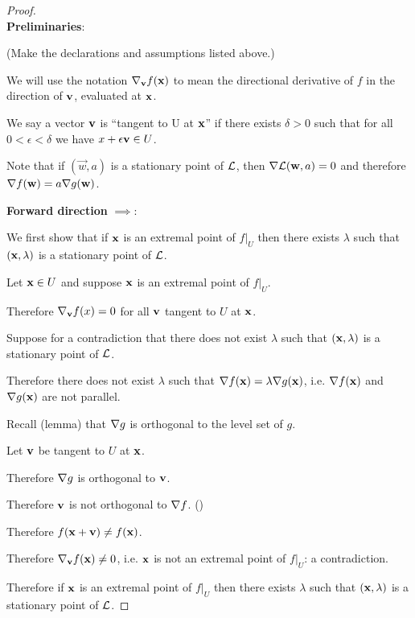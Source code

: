 \begin{lemma}
  \todo{}
\end{lemma}


\begin{proof}~\\
  {\bf Preliminaries}:

  (Make the declarations and assumptions listed above.)

  We will use the notation $\nabla_{\mathbf{v}} f(\mathbf x)$ to mean the directional derivative of $f$ in the
  direction of $\mathbf v$, evaluated at $\mathbf x$.

  We say a vector $\mathbf v$ is ``tangent to U at $\mathbf x$'' if there exists $\delta > 0$ such that for all
  $0 < \epsilon < \delta$ we have $x + \epsilon \mathbf v \in U$. 

  Note that if $(\vec{w}, a)$ is a stationary point of $\mathcal{L}$, then $\nabla \mathcal{L}(\mathbf{w}, a) = 0$ and therefore
  $\nabla f(\mathbf{w}) = a \nabla g(\mathbf{w})$.

  {\bf Forward direction} $\implies$:

  We first show that if $\mathbf x$ is an extremal point of $f|_U$ then there exists $\lambda$ such
  that $(\mathbf x, \lambda)$ is a stationary point of $\mathcal{L}$.

  Let $\mathbf x \in U$ and suppose $\mathbf x$ is an extremal point of $f|_U$.

  Therefore $\nabla_{\mathbf v}f(x) = 0$ for all $\mathbf v$ tangent to $U$ at $\mathbf x$.

  Suppose for a contradiction that there does not exist $\lambda$ such that $(\mathbf x, \lambda)$ is a
  stationary point of $\mathcal{L}$.

  Therefore there does not exist $\lambda$ such that $\nabla f(\mathbf x) = \lambda \nabla g(\mathbf x)$,
  i.e. $\nabla f(\mathbf x)$ and $\nabla g(\mathbf x)$ are not parallel.

  Recall (lemma) that $\nabla g$ is orthogonal to the level set of $g$.

  Let $\mathbf v$ be tangent to $U$ at $\mathbf x$.

  Therefore $\nabla g$ is orthogonal to $\mathbf v$.

  Therefore $\mathbf v$ is not orthogonal to $\nabla f$. ()

  Therefore $f(\mathbf x + \mathbf v) \neq f(\mathbf x)$.

  Therefore $\nabla_\mathbf v f(\mathbf x) \neq 0$, i.e. $\mathbf x$ is not an extremal point of $f|_U$: a contradiction.

  Therefore if $\mathbf x$ is an extremal point of $f|_U$ then there exists $\lambda$ such that $(\mathbf x, \lambda)$ is a stationary point of $\\\mathcal{L}$.


\end{proof}
